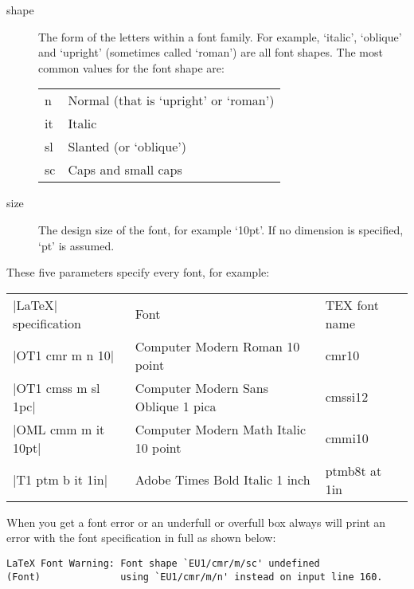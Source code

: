 \begin{description}
\item[shape] The form of the letters within a font family. For example, `italic',
`oblique' and `upright' (sometimes called `roman') are all font shapes. The most common values for the font shape are:

\begin{longtable}{ll}
n  &Normal (that is `upright' or `roman')\\
it &Italic\\
sl &Slanted (or `oblique')\\
sc &Caps and small caps\\
\end{longtable}

\item[size] The design size of the font, for example `10pt'. If no dimension is specified, `pt' is assumed.
\end{description}

These five parameters specify every \latex
font, for example:

\begin{longtable}{lll}
|LaTeX| specification &Font  &TEX font name\\
|OT1 cmr m n 10|      &Computer Modern Roman 10 point &cmr10\\
|OT1 cmss m sl 1pc|   &Computer Modern Sans Oblique 1 pica &cmssi12\\
|OML cmm m it 10pt|   &Computer Modern Math Italic 10 point &cmmi10\\
|T1 ptm b it 1in|  &Adobe Times Bold Italic 1 inch &ptmb8t at 1in\\
\end{longtable}

When you get a font error or an underfull or overfull box \tex always will print an error with the font specification in full as shown below:

\begin{verbatim}
LaTeX Font Warning: Font shape `EU1/cmr/m/sc' undefined
(Font)              using `EU1/cmr/m/n' instead on input line 160.
\end{verbatim}



